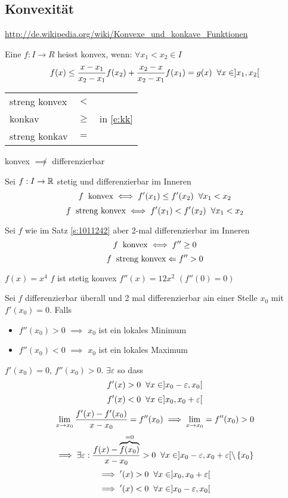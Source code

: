 \subsection{Konvexität}
\url{http://de.wikipedia.org/wiki/Konvexe_und_konkave_Funktionen}
\begin{Def}
  Eine $f:I\to R$ heisst konvex, wenn:
  $\forall x_1 < x_2\in I$
  \begin{equation}\label{e:kk}
    f(x)\leq\frac{x-x_1}{x_2-x_1}f(x_2)+\frac{x_2-x}{x_2-x_1}f(x_1)=g(x)\hspace{2mm}\forall x\in ]x_1,x_2[
  \end{equation}
  \begin{tabular}{l|c|l}
    streng konvex & $<$\\
    konkav & $\geq$& in \ref{e:kk}\\
    streng konkav & $=$\\
  \end{tabular}
\end{Def}
\begin{Bem}
  konvex $\not\implies$ differenzierbar
\end{Bem}
\begin{Sat}\label{s:1011242}
  Sei $f:I\to\mathbb{R}$ stetig und differenzierbar im Inneren
  \[f\hspace{2mm}\text{konvex} \iff f'(x_1)\leq f'(x_2)\hspace{2mm}\forall x_1<x_2\]
  \[f\hspace{2mm}\text{streng konvex} \iff f'(x_1) < f'(x_2)\hspace{2mm}\forall x_1<x_2\]
\end{Sat}
\begin{Kor}
  Sei $f$ wie im Satz \ref{s:1011242} aber 2-mal differenzierbar im Inneren
  \[f\hspace{2mm}\text{konvex}\iff f''\geq 0\]
  \[f\hspace{2mm}\text{streng konvex}\Leftarrow f''> 0\]
\end{Kor}
\begin{Bsp}
  $f(x)=x^4$ $f$ ist stetig konvex $f''(x)=12x^2$ $(f''(0)=0)$
\end{Bsp}
\begin{Bem}
  Sei $f$ differenzierbar überall und 2 mal differenzierbar ain einer Stelle $x_0$ mit $f'(x_0)=0$. Falls 
  \begin{itemize}
    \item $f''(x_0)>0$ $\implies$ $x_0$ ist ein lokales Minimum
    \item $f''(x_0)<0$ $\implies$ $x_0$ ist ein lokales Maximum
  \end{itemize}
\end{Bem}
\begin{Bsp}
  $f'(x_0)=0$, $f''(x_0)>0$. $\exists \varepsilon$ so dass
  \[f'(x)>0\hspace{2mm}\forall x\in ]x_0-\varepsilon,x_0[\]
  \[f'(x)<0\hspace{2mm}\forall x\in ]x_0,x_0+\varepsilon[\]
  \[\displaystyle\lim_{x\rightarrow x_0}\frac{f'(x)-f'(x_0)}{x-x_0}=f''(x_0)\implies\displaystyle\lim_{x\rightarrow x_0}=f''(x_0)>0\]
  \[\implies\exists\varepsilon:\frac{f(x)-\overbrace{f(x_0)}^{=0}}{x-x_0}>0\hspace{2mm}\forall x\in]x_0-\varepsilon,x_0+\varepsilon[\setminus\left\{ x_0 \right\}\]
  \[\implies'(x)>0\hspace{2mm}\forall x\in ]x_0,x_0+\varepsilon[\]
  \[\implies'(x)<0\hspace{2mm}\forall x\in ]x_0-\varepsilon,x_0[\]
\end{Bsp}

